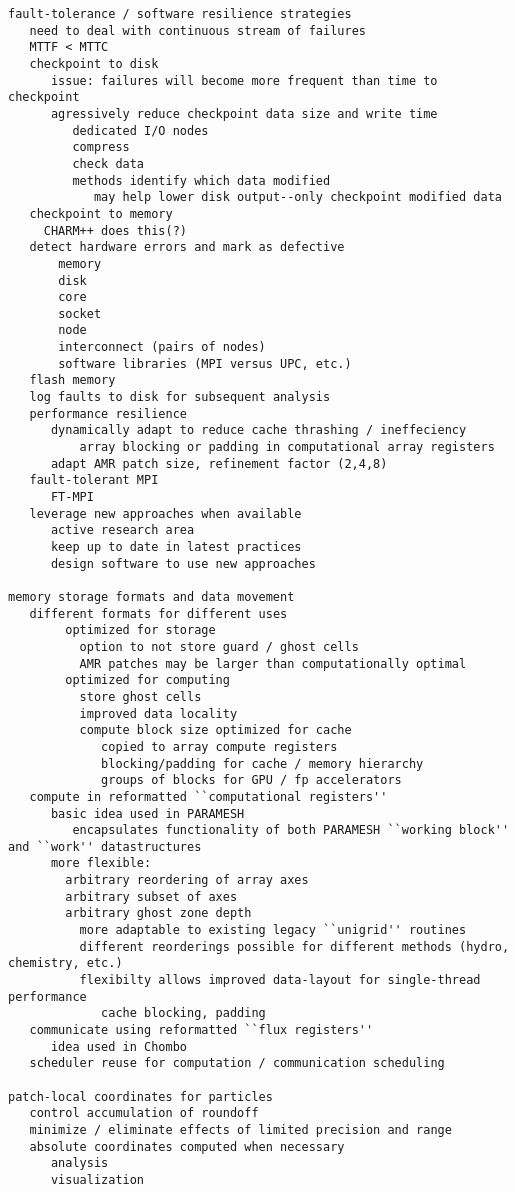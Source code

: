 \documentclass[14pt,letter]{article}
\begin{document}
\begin{verbatim}
fault-tolerance / software resilience strategies
   need to deal with continuous stream of failures
   MTTF < MTTC
   checkpoint to disk
      issue: failures will become more frequent than time to checkpoint
      agressively reduce checkpoint data size and write time
         dedicated I/O nodes
         compress
         check data
         methods identify which data modified
            may help lower disk output--only checkpoint modified data
   checkpoint to memory
     CHARM++ does this(?)
   detect hardware errors and mark as defective
       memory
       disk
       core
       socket
       node
       interconnect (pairs of nodes)
       software libraries (MPI versus UPC, etc.)
   flash memory
   log faults to disk for subsequent analysis
   performance resilience
      dynamically adapt to reduce cache thrashing / ineffeciency
          array blocking or padding in computational array registers
      adapt AMR patch size, refinement factor (2,4,8)
   fault-tolerant MPI
      FT-MPI
   leverage new approaches when available
      active research area
      keep up to date in latest practices
      design software to use new approaches

memory storage formats and data movement
   different formats for different uses
        optimized for storage
          option to not store guard / ghost cells
          AMR patches may be larger than computationally optimal
        optimized for computing
          store ghost cells
          improved data locality
          compute block size optimized for cache
             copied to array compute registers
             blocking/padding for cache / memory hierarchy
             groups of blocks for GPU / fp accelerators
   compute in reformatted ``computational registers''
      basic idea used in PARAMESH
         encapsulates functionality of both PARAMESH ``working block'' and ``work'' datastructures
      more flexible:
        arbitrary reordering of array axes
        arbitrary subset of axes
        arbitrary ghost zone depth
          more adaptable to existing legacy ``unigrid'' routines
          different reorderings possible for different methods (hydro, chemistry, etc.)
          flexibilty allows improved data-layout for single-thread performance
             cache blocking, padding
   communicate using reformatted ``flux registers''
      idea used in Chombo
   scheduler reuse for computation / communication scheduling

patch-local coordinates for particles
   control accumulation of roundoff
   minimize / eliminate effects of limited precision and range
   absolute coordinates computed when necessary
      analysis
      visualization


\end{verbatim}
\end{document}
